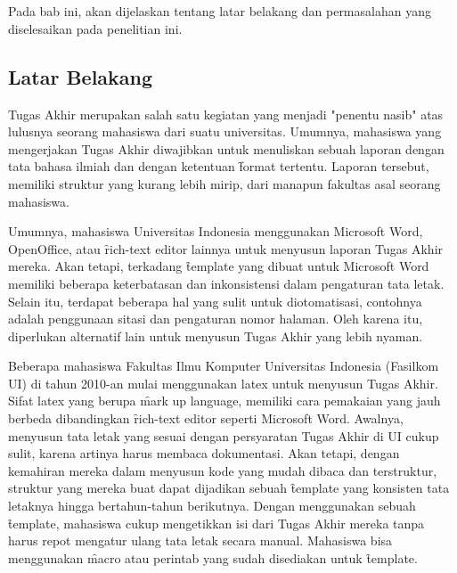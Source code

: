 \chapter{\babSatu}
\label{bab:1}
Pada bab ini, akan dijelaskan tentang latar belakang dan permasalahan yang diselesaikan pada penelitian ini.


\section{Latar Belakang}
\label{sec:latarBelakang}

Tugas Akhir merupakan salah satu kegiatan yang menjadi "penentu nasib" atas lulusnya seorang mahasiswa dari suatu universitas.
Umumnya, mahasiswa yang mengerjakan Tugas Akhir diwajibkan untuk menuliskan sebuah laporan dengan tata bahasa ilmiah dan dengan ketentuan \f{format} tertentu.
Laporan tersebut, memiliki struktur yang kurang lebih mirip, dari manapun fakultas asal seorang mahasiswa.

Umumnya, mahasiswa Universitas Indonesia menggunakan Microsoft Word, OpenOffice, atau \f{rich-text editor} lainnya untuk menyusun laporan Tugas Akhir mereka.
Akan tetapi, terkadang \f{template} yang dibuat untuk Microsoft Word memiliki beberapa keterbatasan dan inkonsistensi dalam pengaturan tata letak.
Selain itu, terdapat beberapa hal yang sulit untuk diotomatisasi, contohnya adalah penggunaan sitasi dan pengaturan nomor halaman.
Oleh karena itu, diperlukan alternatif lain untuk menyusun Tugas Akhir yang lebih nyaman.

Beberapa mahasiswa Fakultas Ilmu Komputer Universitas Indonesia (Fasilkom UI) di tahun 2010-an mulai menggunakan \gls{latex} untuk menyusun Tugas Akhir.
Sifat \gls{latex} yang berupa \f{mark up language}, memiliki cara pemakaian yang jauh berbeda dibandingkan \f{rich-text editor} seperti Microsoft Word.
Awalnya, menyusun tata letak yang sesuai dengan persyaratan Tugas Akhir di UI cukup sulit, karena artinya harus membaca dokumentasi.
Akan tetapi, dengan kemahiran mereka dalam menyusun kode yang mudah dibaca dan terstruktur, struktur yang mereka buat dapat dijadikan sebuah \f{template} yang konsisten tata letaknya hingga bertahun-tahun berikutnya.
Dengan menggunakan sebuah \f{template}, mahasiswa cukup mengetikkan isi dari Tugas Akhir mereka tanpa harus repot mengatur ulang tata letak secara manual.
Mahasiswa bisa menggunakan \f{macro} atau perintab yang sudah disediakan untuk \f{template}.

